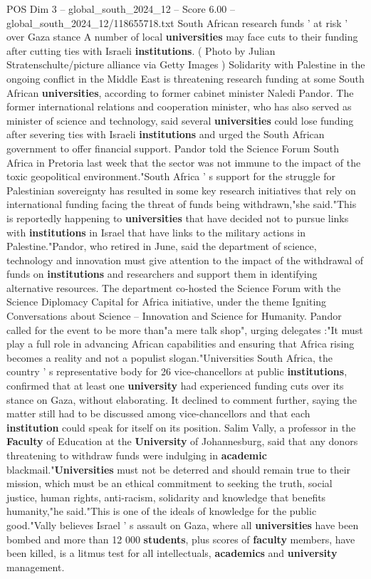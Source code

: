 \begin{textsample}{POS Dim 3 – global\_south\_2024\_12 – Score 6.00 – global\_south\_2024\_12/118655718.txt}  \label{ex:f3_pos_392}
South African research funds ' at risk ' over Gaza stance A number of local \textbf{universities} may face cuts to their funding after cutting ties with Israeli \textbf{institutions}. ( Photo by Julian Stratenschulte/picture alliance via Getty Images ) Solidarity with Palestine in the ongoing conflict in the Middle East is threatening research funding at some South African \textbf{universities}, according to former cabinet minister Naledi Pandor.
The former international relations and cooperation minister, who has also served as minister of science and technology, said several \textbf{universities} could lose funding after severing ties with Israeli \textbf{institutions} and urged the South African government to offer financial support.
Pandor told the Science Forum South Africa in Pretoria last week that the sector was not immune to the impact of the toxic geopolitical environment."South Africa ' s support for the struggle for Palestinian sovereignty has resulted in some key research initiatives that rely on international funding facing the threat of funds being withdrawn,"she said."This is reportedly happening to \textbf{universities} that have decided not to pursue links with \textbf{institutions} in Israel that have links to the military actions in Palestine."Pandor, who retired in June, said the department of science, technology and innovation must give attention to the impact of the withdrawal of funds on \textbf{institutions} and researchers and support them in identifying alternative resources.
The department co-hosted the Science Forum with the Science Diplomacy Capital for Africa initiative, under the theme Igniting Conversations about Science -- Innovation and Science for Humanity.
Pandor called for the event to be more than"a mere talk shop", urging delegates :"It must play a full role in advancing African capabilities and ensuring that Africa rising becomes a reality and not a populist slogan."Universities South Africa, the country ' s representative body for 26 vice-chancellors at public \textbf{institutions}, confirmed that at least one \textbf{university} had experienced funding cuts over its stance on Gaza, without elaborating.
It declined to comment further, saying the matter still had to be discussed among vice-chancellors and that each \textbf{institution} could speak for itself on its position.
Salim Vally, a professor in the \textbf{Faculty} of Education at the \textbf{University} of Johannesburg, said that any donors threatening to withdraw funds were indulging in \textbf{academic} blackmail."\textbf{Universities} must not be deterred and should remain true to their mission, which must be an ethical commitment to seeking the truth, social justice, human rights, anti-racism, solidarity and knowledge that benefits humanity,"he said."This is one of the ideals of knowledge for the public good."Vally believes Israel ' s assault on Gaza, where all \textbf{universities} have been bombed and more than 12 000 \textbf{students}, plus scores of \textbf{faculty} members, have been killed, is a litmus test for all intellectuals, \textbf{academics} and \textbf{university} management.

\end{textsample}
